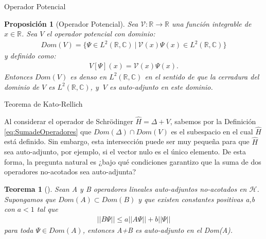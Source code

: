 \documentclass[aspectratio=1610]{beamer}
\newcommand*{\field}[1]{\mathbb{#1}}
\newtheorem*{teo}{Teorema}
\newtheorem*{prop}{Proposición}
\begin{document}
\begin{frame}{Operador Potencial}

\begin{prop}[Operador Potencial]
    Sea $\mathcal{V}:\field{R}\rightarrow\field{R}$ una función integrable de $x\in\field{R}$. Sea $V$ el operador potencial con dominio:
    \begin{align*}  Dom(V) = \{
        \Psi\in L^{2}(\field{R},\field{C})\:|\:\mathcal{V}(x)\Psi(x)\in L^{2}(\field{R},\field{C})
        \}
    \end{align*}
    y definido como:
    \begin{align*}
        V[\Psi](x) = \mathcal{V}(x)\Psi(x).
    \end{align*}
    Entonces $Dom(V)$ es denso en $L^{2}(\field{R},\field{C})$ en el sentido de que la cerradura del dominio de $V$ es $L^{2}(\field{R},\field{C})$, y $\:V$ es auto-adjunto en este dominio.
    \label{prop:DomPot}
\end{prop}
    
\end{frame}


\begin{frame}{Teorema de Kato-Rellich}

Al considerar el operador de Schrödinger $\hat{H} = \Delta + V$, sabemos por la Definición \eqref{eq:SumadeOperadores} que $Dom(\Delta)\cap Dom(V)$ es el subespacio en el cual $\hat{H}$ está definido. Sin embargo, esta intersección puede ser muy pequeña para que $\hat{H}$ sea auto-adjunto, por ejemplo, si el vector nulo es el único elemento. De esta forma, la pregunta natural es ¿bajo qué condiciones garantizo que la suma de dos operadores no-acotados sea auto-adjunta?

\begin{teo}[]
    Sean  A y B operadores lineales auto-adjuntos no-acotados en $\mathcal{H}$. Supongamos que $Dom(A)\subset Dom(B)$ y que existen constantes positivas a,b con $a<1$ tal que
    \begin{align*}
        ||B\Psi|| \leq a||A\Psi|| + b||\Psi||
    \end{align*}
    para toda $\Psi\in Dom(A)$, entonces A+B es auto-adjunto en el Dom(A).
    \label{teo:K-R}
\end{teo}    
\end{frame}
\end{document}
